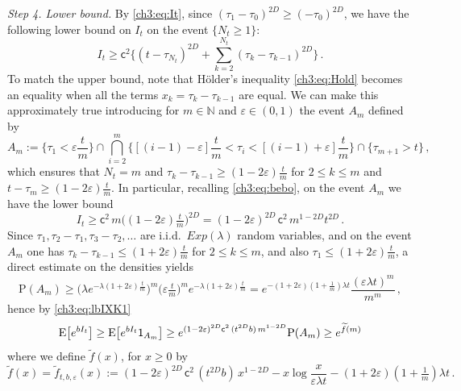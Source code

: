 \documentclass[a4paper,reqno,11pt]{amsart}
\numberwithin{equation}{section}
\renewcommand{\tilde}{\widetilde}          %
\newcommand{\N}{\mathbb{N}}
\newcommand{\PEfont}{\mathrm}
\renewcommand{\P}{\ensuremath{\PEfont P}}
\newcommand{\E}{\ensuremath{\PEfont E}}
\newcommand{\ind}{{\sf 1}}
\renewcommand{\epsilon}{\varepsilon}
\newcommand\sfc{\mathsf{c}}
\begin{document}
\medskip
\noindent
\emph{Step 4. Lower bound.}
By \eqref{ch3:eq:It},
since $(\tau_1 - \tau_0)^{2D} \ge (-\tau_0)^{2D}$, we have
the following lower bound on $I_t$ on the event $\{N_t \ge 1\}$:
\begin{equation} \label{ch3:eq:bebo}
      	I_t \ge \sfc^2
	\Bigg\{ (t-\tau_{N_t})^{2D} +
	\sum_{k=2}^{N_t} (\tau_k - \tau_{k-1})^{2D} \Bigg\} \,.
\end{equation}
To match the upper bound, note that
H\"older's inequality \eqref{ch3:eq:Hold} becomes an equality when 
all the terms $x_k = \tau_k - \tau_{k-1}$ are equal. We can make this
approximately true 
introducing for $m\in\N$ and $\varepsilon \in (0,1)$ the event $A_m$ defined by
\begin{equation} \label{ch3:eq:Am}
	A_m := \bigg\{ \tau_1 < \varepsilon\frac{t}{m} \bigg\}
        \cap \bigcap_{i=2}^{m} 
       \bigg\{[(i-1) - \varepsilon]\frac{t}{m} < \tau_i
       <[(i-1) + \varepsilon]\frac{t}{m} \bigg\}
       \cap \big\{ \tau_{m+1} > t \big\} \,,
\end{equation}
which ensures that $N_t = m$ and $\tau_k - \tau_{k-1} \geq (1- 2\varepsilon) \tfrac{t}{m}$
for $2 \le k \le m$ and $t - \tau_{m} \geq (1-2\varepsilon) \tfrac{t}{m}$.
In particular, recalling \eqref{ch3:eq:bebo},
on the event $A_m$ we have the lower bound
\begin{equation} \label{ch3:eq:lbIXK1}
	I_t \geq \sfc^2 \, m \big((1-2\varepsilon) 
	\tfrac{t}{m} \big)^{2D}
	= (1-2\varepsilon)^{2D}
	 \, \sfc^2 \, m^{1-2D} t^{2D}\,.
\end{equation}
Since $\tau_1, \tau_2 - \tau_{1}, \tau_3 - \tau_2, \ldots$ are i.i.d.\ $Exp(\lambda)$
random variables, 
and on the event $A_m$ one has $\tau_k - \tau_{k-1} \leq (1+ 2\varepsilon) \tfrac{t}{m}$
for $2 \le k \le m$, and also $\tau_1 \leq (1+ 2\varepsilon) \tfrac{t}{m}$,
a direct estimate on the densities yields
\begin{equation} \label{ch3:eq:lbIXK2}
	\P(A_m) \ge \big( \lambda e^{-\lambda(1+2\varepsilon)
	 \frac{t}{m}} \big)^{m} 
	\big( \varepsilon \tfrac{t}{m} \big)^{m}  e^{-\lambda(1+2\varepsilon)
	 \frac{t}{m}}=
	e^{-(1+2\varepsilon)(1+\frac{1}{m})\lambda t}
	\frac{(\varepsilon \lambda t)^m}{m^m} \,,
\end{equation}
hence by \eqref{ch3:eq:lbIXK1}
\begin{equation}\label{ch3:eq:eqLBXKE}
 \E\big[ e^{bI_t} \big] \geq 
 \E\big[ e^{bI_t} \ind_{A_m} \big] \geq 
 e^{(1-2\epsilon)^{2D} \sfc^2 \, (t^{2D} b) \, m^{1-2D}}\P(A_m)
 \geq e^{\tilde f(m)}
\end{equation}
where we define $\tilde f(x)$, for $x\geq 0$ by
\begin{displaymath}
	\tilde f(x) = \tilde f_{t,b,\epsilon}(x) := (1-2\epsilon)^{2D}\, \sfc^2\, ( t^{2D}b) \, x^{1-2D}
	- x\log \frac{x}{\epsilon \lambda t} 
       -(1+2\varepsilon)(1+\tfrac{1}{m})\lambda t\,.
\end{displaymath}
\end{document}
